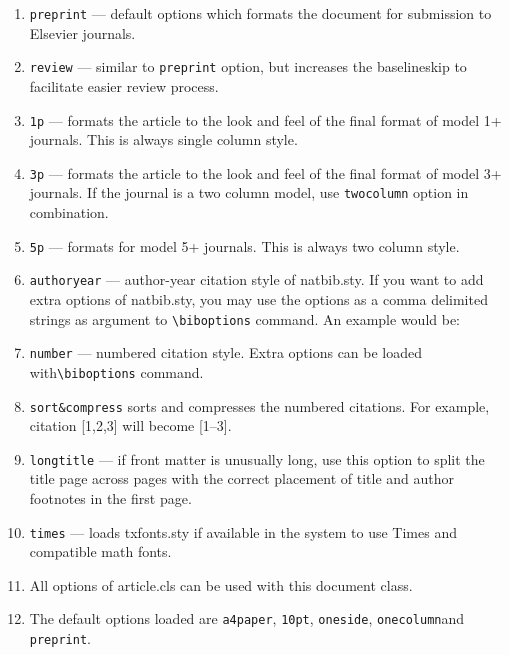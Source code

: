 \documentclass[a4paper,12pt]{article}
\def\file#1{\textsf{#1}\xspace}
\begin{document}
\begin{enumerate}[(1)]
\advance\itemsep4pt
\item \verb+preprint+ --- default options which formats the
  document for submission to Elsevier journals.

\item \verb+review+ --- similar to \verb+preprint+ option, but
  increases the baselineskip to facilitate easier review process.

\item \verb+1p+ --- formats the article to the look and feel of the final
  format of model 1+ journals. This is always single column style.

\item \verb+3p+ --- formats the article to the look and feel of the final
  format of model 3+ journals. If the journal is a two column
model, use \verb+twocolumn+ option in combination.

\item \verb+5p+ --- formats for model 5+ journals. This is always
  two column style.

\item \verb+authoryear+ --- author-year citation style of
  \file{natbib.sty}. If you want to add extra options of
\file{natbib.sty}, you may use the options as a comma delimited
strings as argument to \verb+\biboptions+ command. An example
would be:
\end{enumerate}
\begin{vquote}
\end{vquote}

\begin{enumerate}[(1)] \setcounter{enumi}{6}
\advance\itemsep4pt
\item \verb+number+ --- numbered citation style. Extra options
  can be loaded with\linebreak \verb+\biboptions+ command.

\item \verb+sort&compress+ sorts and compresses the
numbered citations. For example, citation [1,2,3] will become [1--3].

\item \verb+longtitle+ --- if front matter is unusually long, use
  this option to split the title page across pages with the correct
placement of title and author footnotes in the first page.

\item \verb+times+ --- loads \file{txfonts.sty} if available in
  the system to use Times and compatible math fonts.

\item All options of \file{article.cls} can be used with this
  document class.

\item The default options loaded are \verb+a4paper+, \verb+10pt+,
  \verb+oneside+, \verb+onecolumn+\linebreak and \verb+preprint+.

\end{enumerate}
\end{document}
